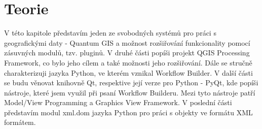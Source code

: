 \chapter{Teorie}
V této kapitole představím jeden ze svobodných systémů pro práci s geografickými daty - Quantum GIS a možnost rozšiřování funkcionality pomocí zásuvných modulů, tzv. pluginů. V druhé části popíši projekt QGIS Processing Framework, co bylo jeho cílem a také možnosti jeho rozšiřování. Dále se stručně charakterizuji jazyka Python, ve kterém vznikal Workflow Builder. V další části se budu věnovat knihovně Qt, respektive její verze pro Python - PyQt, kde popíši nástroje, které jsem využil při psaní Workflow Builderu. Mezi tyto nástroje patří Model/View Programming a Graphics View Framework. V poslední části představím modul xml.dom jazyka Python pro práci s objekty ve formátu XML formátem.





